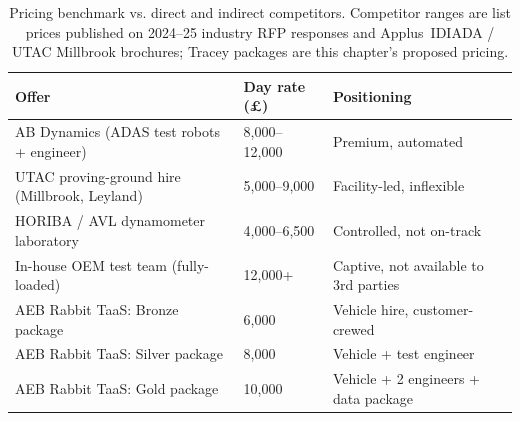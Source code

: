 \begin{table}[H]
\centering
\small
\caption{Pricing benchmark vs. direct and indirect competitors. 
Competitor ranges are list prices published on 2024--25 industry 
RFP responses and Applus~IDIADA / UTAC Millbrook brochures; Tracey 
packages are this chapter's proposed pricing.}
\label{tab:pricing_benchmark}
\begin{tabular}{p{6cm}p{3cm}p{5cm}}
\toprule
\textbf{Offer} & \textbf{Day rate (\pounds)} & \textbf{Positioning} \\
\midrule
AB Dynamics (ADAS test robots + engineer) & 8,000--12,000 & Premium, automated \\
UTAC proving-ground hire (Millbrook, Leyland) & 5,000--9,000 & Facility-led, inflexible \\
HORIBA / AVL dynamometer laboratory & 4,000--6,500 & Controlled, not on-track \\
In-house OEM test team (fully-loaded) & 12,000+ & Captive, not available to 3rd parties \\
AEB Rabbit TaaS: Bronze package & 6,000 & Vehicle hire, customer-crewed \\
AEB Rabbit TaaS: Silver package & 8,000 & Vehicle + test engineer \\
AEB Rabbit TaaS: Gold package & 10,000 & Vehicle + 2 engineers + data package \\
\bottomrule
\end{tabular}
\end{table}
